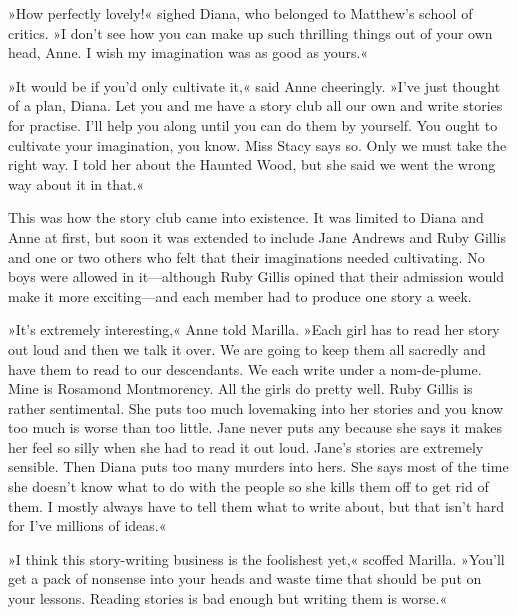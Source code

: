 »How perfectly lovely!« sighed Diana, who belonged to Matthew’s school of critics. »I don’t see how you can make up such thrilling things out of your own head, Anne. I wish my imagination was as good as yours.«

»It would be if you’d only cultivate it,« said Anne cheeringly. »I’ve just thought of a plan, Diana. Let you and me have a story club all our own and write stories for practise. I’ll help you along until you can do them by yourself. You ought to cultivate your imagination, you know. Miss Stacy says so. Only we must take the right way. I told her about the Haunted Wood, but she said we went the wrong way about it in that.«

This was how the story club came into existence. It was limited to Diana and Anne at first, but soon it was extended to include Jane Andrews and Ruby Gillis and one or two others who felt that their imaginations needed cultivating. No boys were allowed in it—although Ruby Gillis opined that their admission would make it more exciting—and each member had to produce one story a week.

»It’s extremely interesting,« Anne told Marilla. »Each girl has to read her story out loud and then we talk it over. We are going to keep them all sacredly and have them to read to our descendants. We each write under a nom-de-plume. Mine is Rosamond Montmorency. All the girls do pretty well. Ruby Gillis is rather sentimental. She puts too much lovemaking into her stories and you know too much is worse than too little. Jane never puts any because she says it makes her feel so silly when she had to read it out loud. Jane’s stories are extremely sensible. Then Diana puts too many murders into hers. She says most of the time she doesn’t know what to do with the people so she kills them off to get rid of them. I mostly always have to tell them what to write about, but that isn’t hard for I’ve millions of ideas.«

»I think this story-writing business is the foolishest yet,« scoffed Marilla. »You’ll get a pack of nonsense into your heads and waste time that should be put on your lessons. Reading stories is bad enough but writing them is worse.«

